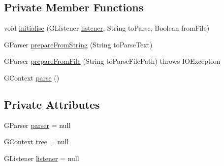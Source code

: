 \subsection*{Private Member Functions}
\begin{DoxyCompactItemize}
\item 
void \hyperlink{classit_1_1emarolab_1_1cagg_1_1core_1_1language_1_1parser_1_1ANTLRInterface_1_1ParserBase_3_01GL50c14717389f32c0d6ed45a3d8ee0386_a3c3a3a644e337a5f6275be2866a2fde5}{initialise} (G\-Listener \hyperlink{classit_1_1emarolab_1_1cagg_1_1core_1_1language_1_1parser_1_1ANTLRInterface_1_1ParserBase_3_01GL50c14717389f32c0d6ed45a3d8ee0386_aa1857a69d5cdd768a2507d9c87fb3d7b}{listener}, String to\-Parse, Boolean from\-File)
\item 
G\-Parser \hyperlink{classit_1_1emarolab_1_1cagg_1_1core_1_1language_1_1parser_1_1ANTLRInterface_1_1ParserBase_3_01GL50c14717389f32c0d6ed45a3d8ee0386_a2f1a92e469874ab1c947b47e13918979}{prepare\-From\-String} (String to\-Parse\-Text)
\item 
G\-Parser \hyperlink{classit_1_1emarolab_1_1cagg_1_1core_1_1language_1_1parser_1_1ANTLRInterface_1_1ParserBase_3_01GL50c14717389f32c0d6ed45a3d8ee0386_ac228d18de9f083dc461a648397f218b5}{prepare\-From\-File} (String to\-Parse\-File\-Path)  throws I\-O\-Exception 
\item 
G\-Context \hyperlink{classit_1_1emarolab_1_1cagg_1_1core_1_1language_1_1parser_1_1ANTLRInterface_1_1ParserBase_3_01GL50c14717389f32c0d6ed45a3d8ee0386_a28fc9b98cd38a5a7317052408014677c}{parse} ()
\end{DoxyCompactItemize}
\subsection*{Private Attributes}
\begin{DoxyCompactItemize}
\item 
G\-Parser \hyperlink{classit_1_1emarolab_1_1cagg_1_1core_1_1language_1_1parser_1_1ANTLRInterface_1_1ParserBase_3_01GL50c14717389f32c0d6ed45a3d8ee0386_a3298e4eaf5cfd7ac7bbd6b5edeab5954}{parser} = null
\item 
G\-Context \hyperlink{classit_1_1emarolab_1_1cagg_1_1core_1_1language_1_1parser_1_1ANTLRInterface_1_1ParserBase_3_01GL50c14717389f32c0d6ed45a3d8ee0386_a936b8bb0feaf17dc30550a3deb796faa}{tree} = null
\item 
G\-Listener \hyperlink{classit_1_1emarolab_1_1cagg_1_1core_1_1language_1_1parser_1_1ANTLRInterface_1_1ParserBase_3_01GL50c14717389f32c0d6ed45a3d8ee0386_aa1857a69d5cdd768a2507d9c87fb3d7b}{listener} = null
\end{DoxyCompactItemize}


